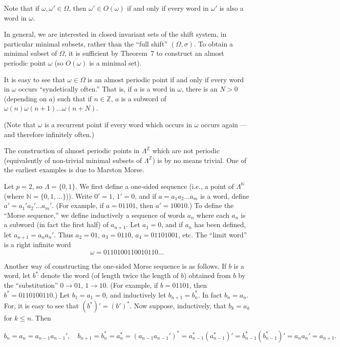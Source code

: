 Note that if $\omega, \omega' \in \Omega$, then $\omega' \in \overline{O(\omega)}$ if and only if every word in $\omega'$ is also a word in $\omega$.

In general, we are interested in closed invariant sets of the shift system, in particular minimal subsets, rather than the “full shift” $(\Omega, \sigma)$. To obtain a minimal subset of $\Omega$, it is sufficient by Theorem~7 to construct an almost periodic point $\omega$ (so $\overline{O(\omega)}$ is a minimal set).

It is easy to see that $\omega \in \Omega$ is an almost periodic point if and only if every word in $\omega$ occurs “syndetically often.” That is, if $a$ is a word in $\omega$, there is an $N > 0$ (depending on $a$) such that if $n \in \mathbb{Z}$, $a$ is a subword of $\omega(n)\omega(n+1)\ldots\omega(n+N)$.

(Note that $\omega$ is a recurrent point if every word which occurs in $\omega$ occurs again — and therefore infinitely often.)


The construction of almost periodic points in $\Lambda^{\mathbb{Z}}$ which are not periodic (equivalently of non-trivial minimal subsets of $\Lambda^{\mathbb{Z}}$) is by no means trivial. One of the earliest examples is due to Marston Morse.

Let $p = 2$, so $\Lambda = \{0,1\}$. We first define a one-sided sequence (i.e., a point of $\Lambda^{\mathbb{N}}$ (where $\mathbb{N} = \{0,1,\ldots\}$)). Write $0' = 1$, $1' = 0$, and if $a = a_1 a_2 \ldots a_m$ is a word, define $a' = a_1' a_2' \ldots a_m'$. (For example, if $a = 01101$, then $a' = 10010$.) To define the “Morse sequence,” we define inductively a sequence of words $a_n$ where each $a_n$ is a subword (in fact the first half) of $a_{n+1}$. Let $a_1 = 0$, and if $a_n$ has been defined, let $a_{n+1} = a_n a_n'$. Thus $a_2 = 01$, $a_3 = 0110$, $a_4 = 01101001$, etc. The “limit word” is a right infinite word
\[
    \omega = 0110100110010110\ldots
\]

Another way of constructing the one-sided Morse sequence is as follows. If $b$ is a word, let $b^*$ denote the word (of length twice the length of $b$) obtained from $b$ by the “substitution” $0 \to 01$, $1 \to 10$. (For example, if $b = 01101$, then $b^* = 0110100110$.) Let $b_1 = a_1 = 0$, and inductively let $b_{n+1} = b_n^*$. In fact $b_n = a_n$. For, it is easy to see that $(b^*)' = (b')^*$. Now suppose, inductively, that $b_k = a_k$ for $k \le n$. Then

\[
    b_n = a_n = a_{n-1} a_{n-1}', \quad b_{n+1} = b_n^* = a_n^* = (a_{n-1} a_{n-1}')^* = a_{n-1}^* (a_{n-1}^*)' = b_{n-1}^* (b_{n-1}^*)' = a_n a_n' = a_{n+1}.
\]

